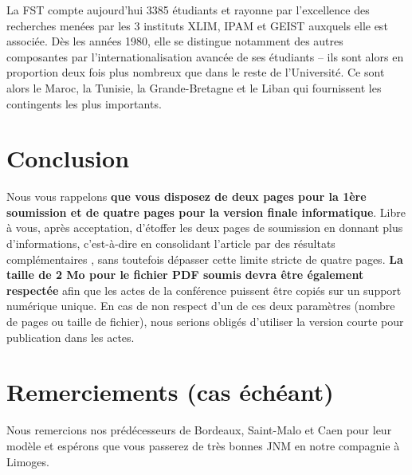 \documentclass{jnm}
\begin{document}
La FST compte aujourd’hui 3385 étudiants et rayonne par l’excellence des recherches menées par les 3 instituts XLIM, IPAM et GEIST auxquels elle est associée. Dès les années 1980, elle se distingue notamment des autres composantes par l’internationalisation avancée de ses étudiants – ils sont alors en proportion deux fois plus nombreux que dans le reste de l’Université. Ce sont alors le Maroc, la Tunisie, la Grande-Bretagne et le Liban qui fournissent les contingents les plus importants.



\section{Conclusion}
Nous vous rappelons \textbf{que vous disposez de deux pages pour la 1ère soumission et de quatre pages pour la version finale informatique}. Libre à vous, après acceptation, d'étoffer les deux pages de soumission en donnant plus d'informations, c'est-à-dire en consolidant l'article par des résultats complémentaires \cite{deplus}, sans toutefois dépasser cette limite stricte de quatre pages. \textbf{La taille de 2 Mo pour le fichier PDF soumis devra être également respectée} afin que les actes de la conférence puissent être copiés sur un support numérique unique. En cas de non respect d'un de ces deux paramètres (nombre de pages ou taille de fichier), nous serions obligés d'utiliser la version courte pour publication dans les actes.



\section{Remerciements (cas échéant)}
Nous remercions nos prédécesseurs de Bordeaux, Saint-Malo et Caen pour leur modèle et espérons que vous passerez de très bonnes JNM en notre compagnie à Limoges.




\vspace{0.5cm}


\end{document}
